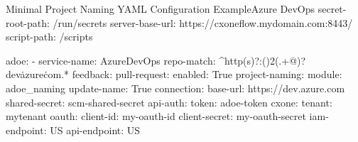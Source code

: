 \begin{code}{Minimal Project Naming YAML Configuration Example}{Azure DevOps}{}
  secret-root-path: /run/secrets
  server-base-url: https://cxoneflow.mydomain.com:8443/
  script-path: /scripts

  adoe:
      - service-name: AzureDevOps
        repo-match: ^http(s)?:(\/){2}(.+@)?dev\.azure\.com.*
        feedback:
          pull-request:
            enabled: True
        project-naming:
          module: adoe_naming
          update-name: True
        connection:
          base-url: https://dev.azure.com
          shared-secret: scm-shared-secret
          api-auth:
            token: adoe-token
        cxone:
          tenant: mytenant
          oauth:
            client-id: my-oauth-id
            client-secret: my-oauth-secret
          iam-endpoint: US
          api-endpoint: US
\end{code}
    